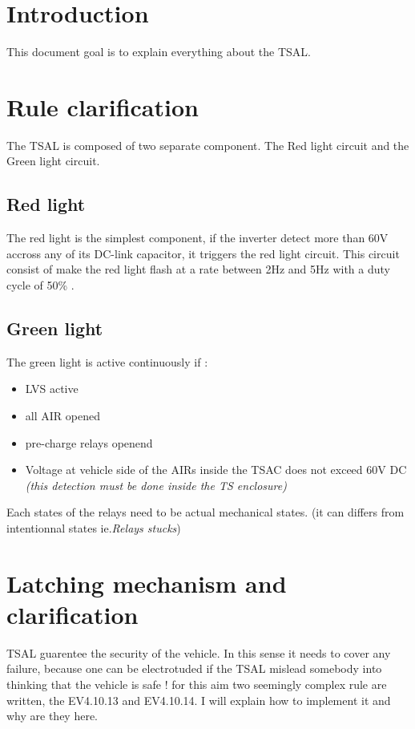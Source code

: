 \documentclass{EPSA-rap-template}
\begin{document}
\fairepagedegarde
\newpage
\tableofcontents

\section{Introduction}

This document goal is to explain everything about the TSAL.

\section{Rule clarification}

The TSAL is composed of two separate component. The Red light circuit and the Green light circuit.

\subsection{Red light}

The red light is the simplest component, if the inverter detect more than 60V accross any of its DC-link capacitor, it triggers the red light circuit. This circuit consist of make the red light flash at a rate between 2Hz and 5Hz with a duty cycle of 50\% .

\subsection{Green light}

The green light is active continuously if :
\begin{itemize}
\item LVS active
\item all AIR opened
\item pre-charge relays openend
\item Voltage at vehicle side of the AIRs inside the TSAC does not exceed 60V DC \textit{(this detection must be done inside the TS enclosure)}
\end{itemize}

Each states of the relays need to be actual mechanical states. (it can differs from intentionnal states ie.\textit{Relays stucks})

\section{Latching mechanism and clarification}

TSAL guarentee the security of the vehicle. In this sense it needs to cover any failure, because one can be electrotuded if the TSAL mislead somebody into thinking that the vehicle is safe ! for this aim two seemingly complex rule are written, the EV4.10.13 and EV4.10.14. I will explain how to implement it and why are they here. 
\end{document}

